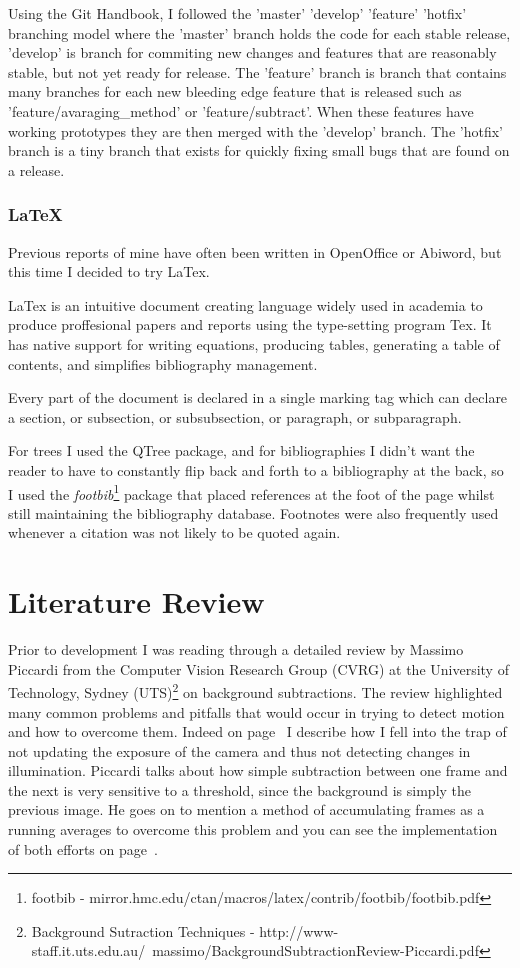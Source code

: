 Using the Git Handbook, I followed the 'master' 'develop' 'feature' 'hotfix' branching model where the 'master' branch holds the code for each stable release, 'develop' is branch for commiting new changes and features that are reasonably stable, but not yet ready for release. The 'feature' branch is branch that contains many branches for each new bleeding edge feature that is released  such as 'feature/avaraging\_method' or 'feature/subtract'. When these features have working prototypes they are then merged with the 'develop' branch. The 'hotfix' branch is a tiny branch that exists for quickly fixing small bugs that are found on a release.
\subsubsection{\LaTeX{}}
Previous reports of mine have often been written in OpenOffice or Abiword, but this time I decided to try LaTex.

LaTex is an intuitive document creating language widely used in academia to produce proffesional papers and reports using the type-setting program Tex. It has native support for writing equations, producing tables, generating a table of contents, and simplifies bibliography management.

Every part of the document is declared in a single marking tag which can declare a section, or subsection, or subsubsection, or paragraph, or subparagraph.

For trees I used the QTree package, and for bibliographies I didn't want the reader to have to constantly flip back and forth to a bibliography at the back, so I used the {\it footbib}\footnote{footbib - mirror.hmc.edu/ctan/macros/latex/contrib/footbib/footbib.pdf}\label{ref:footbibpack} package that placed references at the foot of the page whilst still maintaining the bibliography database. Footnotes were also frequently used whenever a citation was not likely to be quoted again.

\section{Literature Review}
Prior to development I was reading through a detailed review by Massimo Piccardi from the Computer Vision Research Group (CVRG) at the University of Technology, Sydney (UTS)\footnote{Background Sutraction Techniques - http://www-staff.it.uts.edu.au/~massimo/BackgroundSubtractionReview-Piccardi.pdf}\label{ref:backsub} on background subtractions. The review highlighted many common problems and pitfalls that would occur in trying to detect motion and how to overcome them.
Indeed on page~\pageref{autoexpose} I describe how I fell into the trap of not updating the exposure of the camera and thus not detecting changes in illumination.
Piccardi talks about how simple subtraction between one frame and the next is very sensitive to a threshold, since the background is simply the previous image. He goes on to mention a method of accumulating frames as a running averages to overcome this problem and you can see the implementation of both efforts on page~\pageref{proctechniques}.

